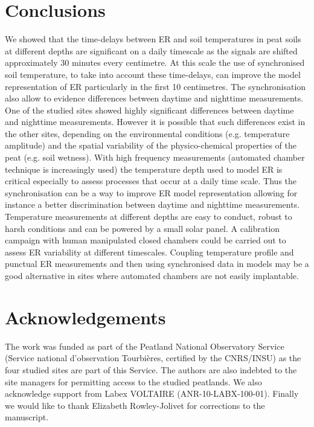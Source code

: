 \section{Conclusions} 

We showed that the time-delays between ER and soil temperatures in peat soils at different depths are significant on a daily timescale as the signals are shifted approximately 30 minutes every centimetre.
At this scale the  use of synchronised soil temperature, to take into account these time-delays, can improve the model representation of ER particularly in the first 10 centimetres.
The synchronisation also allow to evidence differences between daytime and nighttime measurements.
One of the studied sites showed highly significant differences between daytime and nighttime measurements.
However it is possible that such differences exist in the other sites, depending on the environmental conditions (e.g. temperature amplitude) and the spatial variability of the physico-chemical properties of the peat (e.g. soil wetness).
With high frequency measurements (automated chamber technique is increasingly used) the temperature depth used to model ER is critical especially to assess processes that occur at a daily time scale.
Thus the synchronisation can be a way to improve ER model representation allowing for instance a better discrimination between daytime and nighttime measurements.
Temperature measurements at different depths are easy to conduct, robust to harsh conditions and can be powered by a small solar panel.
A calibration campaign with human manipulated closed chambers could be carried out to assess ER variability at different timescales.
Coupling temperature profile and punctual ER measurements and then using synchronised data in models may be a good alternative in sites where automated chambers are not easily implantable.

\section*{Acknowledgements}
The work was funded as part of the Peatland National Observatory Service (Service national d'observation Tourbi\`eres, certified by the CNRS/INSU) as the four studied sites are part of this Service. The authors are also indebted to the site managers for permitting access to the studied peatlands. We also acknowledge support from Labex VOLTAIRE (ANR-10-LABX-100-01). Finally we would like to thank Elizabeth Rowley-Jolivet for corrections to the manuscript.